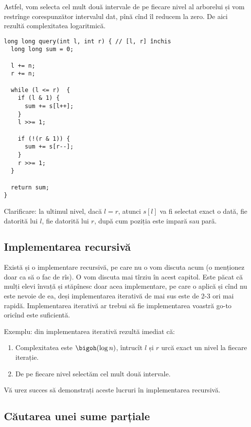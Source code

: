 Astfel, vom selecta cel mult două intervale de pe fiecare nivel al arborelui și vom restrînge corespunzător intervalul dat, pînă cînd îl reducem la zero. De aici rezultă complexitatea logaritmică.

\begin{verbatim}
long long query(int l, int r) { // [l, r] închis
  long long sum = 0;

  l += n;
  r += n;

  while (l <= r)  {
    if (l & 1) {
      sum += s[l++];
    }
    l >>= 1;

    if (!(r & 1)) {
      sum += s[r--];
    }
    r >>= 1;
  }

  return sum;
}
\end{verbatim}

Clarificare: la ultimul nivel, dacă $l = r$, atunci $s[l]$ va fi selectat exact o dată, fie datorită lui $l$, fie datorită lui $r$, după cum poziția este impară sau pară.

\subsection{Implementarea recursivă}

Există și o implementare recursivă, pe care nu o vom discuta acum (o menționez doar ca să o fac de rîs). O vom discuta mai tîrziu în acest capitol. Este păcat că mulți elevi învață și stăpînesc doar acea implementare, pe care o aplică și cînd nu este nevoie de ea, deși implementarea iterativă de mai sus este de 2-3 ori mai rapidă. Implementarea iterativă ar trebui să fie implementarea voastră go-to oricînd este suficientă.

Exemplu: din implementarea iterativă rezultă imediat că:

\begin{enumerate}
  \item  Complexitatea este $\bigoh(\log n)$, întrucît $l$ și $r$ urcă exact un nivel la fiecare iterație.

  \item De pe fiecare nivel selectăm cel mult două intervale.
\end{enumerate}

Vă urez succes să demonstrați aceste lucruri în implementarea recursivă. 

\subsection{Căutarea unei sume parțiale}

